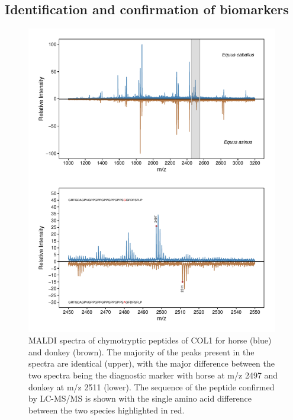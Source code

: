 \documentclass[preprint, 3p, authoryear]{elsarticle} %
\begin{document}
\hypertarget{identification-and-confirmation-of-biomarkers}{%
\subsection{Identification and confirmation of biomarkers}\label{identification-and-confirmation-of-biomarkers}}



\begin{figure}

{\centering \includegraphics[width=0.98\textwidth]{equid_main_files/figure-latex/equidmarkerplot-1} 

}

\caption{MALDI spectra of chymotryptic peptides of COL1 for horse (blue) and donkey (brown). The majority of the peaks present in the spectra are identical (upper), with the major difference between the two spectra being the diagnostic marker with horse at m/z 2497 and donkey at m/z 2511 (lower). The sequence of the peptide confirmed by LC-MS/MS is shown with the single amino acid difference between the two species highlighted in red.}\label{fig:equidmarkerplot}
\end{figure}
\end{document}
